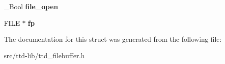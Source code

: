 \begin{DoxyCompactItemize}
\item 
\hypertarget{structttd__fb__t_a21f218e7edb91253d0029e9fa5e0e517}{}\+\_\+\+Bool {\bfseries file\+\_\+open}\label{structttd__fb__t_a21f218e7edb91253d0029e9fa5e0e517}

\item 
\hypertarget{structttd__fb__t_a78c0509bb511a806ce221221a40d43d2}{}F\+I\+L\+E $\ast$ {\bfseries fp}\label{structttd__fb__t_a78c0509bb511a806ce221221a40d43d2}

\end{DoxyCompactItemize}


The documentation for this struct was generated from the following file\+:\begin{DoxyCompactItemize}
\item 
src/ttd-\/lib/ttd\+\_\+filebuffer.\+h\end{DoxyCompactItemize}
